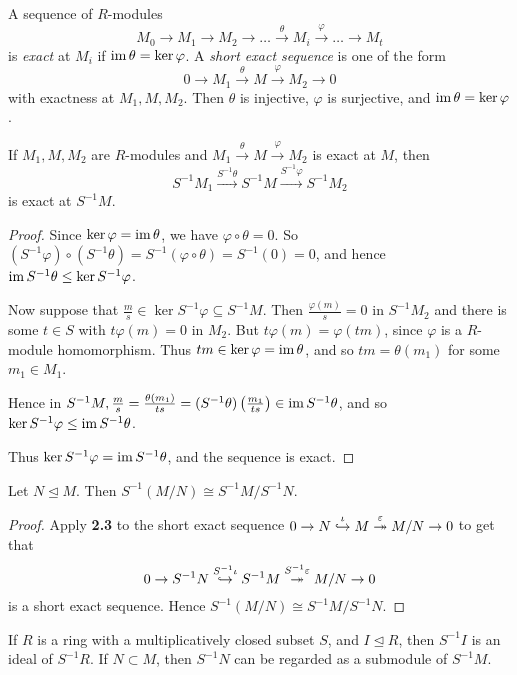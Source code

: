 \documentclass[10pt,a4paper]{article}
\begin{document}
A sequence of $R$-modules
\[M_0 \to M_1 \to M_2 \to\ldots\xrightarrow{\theta}M_i\xrightarrow{\varphi}\ldots\to M_t\]
is \emph{exact} at $M_i$ if $\operatorname{im} \theta = \ker \varphi$. A \emph{short exact sequence} is one of the form
\[ 0 \to M_1 \xrightarrow{\theta} M \xrightarrow{\varphi} M_2 \to 0\]
with exactness at $M_1, M, M_2$. Then $\theta$ is injective, $\varphi$ is surjective, and $\operatorname{im}\theta = \ker \varphi$.
\begin{lemma}
  If $M_1, M, M_2$ are $R$-modules and $M_1\xrightarrow{\theta}M\xrightarrow{\varphi}M_2$ is exact at $M$, then \[S^{-1}M_1 \xrightarrow{S^{-1}\theta} S^{-1}M\xrightarrow{S^{-1}\varphi}S^{-1}M_2\] is exact at $S^{-1}M$.
\end{lemma}
\begin{proof}
  Since $\ker \varphi = \operatorname{im}\theta$, we have $\varphi\circ\theta = 0$. So $(S^{-1}\varphi)\circ(S^{-1}\theta) = S^{-1}(\varphi\circ\theta) = S^{-1}(0) = 0$, and hence $\operatorname{im} S^{-1}\theta \leq \ker S^{-1}\varphi$.

  Now suppose that $\frac{m}{s} \in \ker S^{-1}\varphi \subseteq S^{-1}M$. Then $\frac{\varphi(m)}{s} = 0$ in $S^{-1}M_2$ and there is some $t\in S$ with $t\varphi(m) = 0$ in $M_2$. But $t\varphi(m)=\varphi(tm)$, since $\varphi$ is a $R$-module homomorphism. Thus $tm \in \ker\varphi = \operatorname{im}\theta$, and so $tm =\theta(m_1)$ for some $m_1\in M_1$.

  Hence in $S^{-1}M, \frac{m}{s} = \frac{\theta(m_1)}{ts} = (S^{-1}\theta)\left(\frac{m_1}{ts}\right) \in \operatorname{im} S^{-1}\theta$, and so $\ker S^{-1}\varphi \leq \operatorname{im} S^{-1}\theta$.

  Thus $\ker S^{-1}\varphi = \operatorname{im} S^{-1}\theta$, and the sequence is exact.
\end{proof}
\begin{lemma}
  Let $N \trianglelefteq M$. Then $S^{-1}(M/N) \cong S^{-1}M/S^{-1}N$.
\end{lemma}
\begin{proof}
  Apply \textbf{2.3} to the short exact sequence $0 \to N \stackrel{\iota}{\hookrightarrow} M \stackrel{\varepsilon}{\twoheadrightarrow} M/N \to 0$ to get that
  \[0 \to S^{-1}N \stackrel{S^{-1}\iota}{\hookrightarrow} S^{-1}M \stackrel{S^{-1}\varepsilon}{\twoheadrightarrow} M/N \to 0\]
  is a short exact sequence. Hence $S^{-1}(M/N) \cong S^{-1}M/S^{-1}N$.
\end{proof}
If $R$ is a ring with a multiplicatively closed subset $S$, and $I \trianglelefteq R$, then $S^{-1}I$ is an ideal of $S^{-1}R$. If $N \subset M$, then $S^{-1}N$ can be regarded as a submodule of $S^{-1}M$.
\end{document}
